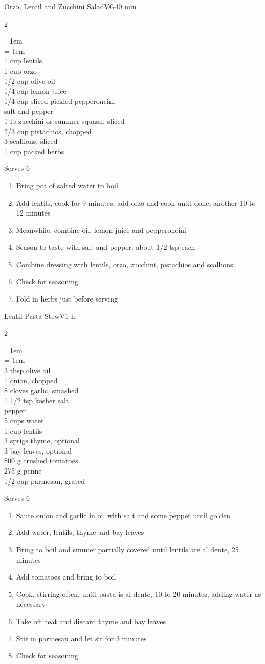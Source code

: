 \documentclass{article}
\newenvironment{recipe}[3][]
    {\begin{cardbase}[#1]{#2}{#3}
    \columnratio{0.333}
    \begin{paracol}{2}}
    {\end{paracol}\end{cardbase}}
\newenvironment{denserecipe}[3][]
    {\small
    \begin{recipe}[#1]{#2}{#3}}
    {\end{recipe}}
\newcommand{\nextcolumn}{\switchcolumn}
\newenvironment{ingredients}
    {
    \begin{obeylines}
    \vspace{\parskip}
    \setlength{\parskip}{0.25em}
    \vspace{-0.25em}
    \leftskip=1em
    \parindent=-1em}
    {\end{obeylines}}
\newenvironment{steps}
    {\begin{enumerate}[leftmargin=*,topsep=0pt]}
    {\end{enumerate}}
\newcommand{\tag}[1]{\hspace{1em}#1}
\newcommand{\symboltag}[2]{\tag{#1\hspace{0.4em}#2}}
\newcommand{\totaltime}[1]{\symboltag{\raisebox{-0.1em}{\small\StopWatchEnd}}{#1}}
\begin{document}
\begin{denserecipe}{Orzo, Lentil and Zucchini Salad}{\tag{VG}\totaltime{40 min}}
\begin{ingredients}
1 cup lentils
1 cup orzo
1/2 cup olive oil
1/4 cup lemon juice
1/4 cup sliced pickled pepperoncini
salt and pepper
1 lb zucchini or summer squash, sliced
2/3 cup pistachios, chopped
3 scallions, sliced
1 cup packed herbs
\end{ingredients}
\nextcolumn
Serves 6
\begin{steps}
    \item Bring pot of salted water to boil
    \item Add lentils, cook for 9 minutes, add orzo and cook until done, another 10 to 12 minutes
    \item Meanwhile, combine oil, lemon juice and pepperoncini
    \item Season to taste with salt and pepper, about 1/2 tsp each
    \item Combine dressing with lentils, orzo, zucchini, pistachios and scallions
    \item Check for seasoning
    \item Fold in herbs just before serving
\end{steps}
\end{denserecipe}

\begin{denserecipe}{Lentil Pasta Stew}{\tag{V}\totaltime{1 h}}
\begin{ingredients}
3 tbsp olive oil
1 onion, chopped
8 cloves garlic, smashed
1 1/2 tsp kosher salt
pepper
5 cups water
1 cup lentils
3 sprigs thyme, optional
3 bay leaves, optional
800 g crushed tomatoes
275 g penne
1/2 cup parmesan, grated
\end{ingredients}
\nextcolumn
Serves 6
\begin{steps}
    \item Saute onion and garlic in oil with salt and some pepper until golden
    \item Add water, lentils, thyme and bay leaves
    \item Bring to boil and simmer partially covered until lentils are al dente, 25 minutes
    \item Add tomatoes and bring to boil
    \item Cook, stirring often, until pasta is al dente, 10 to 20 minutes, adding water as necessary
    \item Take off heat and discard thyme and bay leaves
    \item Stir in parmesan and let sit for 3 minutes
    \item Check for seasoning
\end{steps}
\end{denserecipe}
\end{document}
